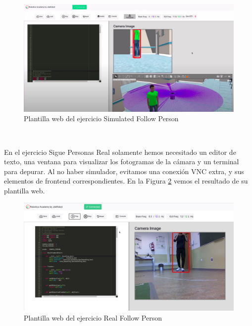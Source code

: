\begin{figure} [H]
  \begin{center}
    \includegraphics[width=15cm]{imagenes/cap5/plantilla-web-simulated-follow-person.png}
  \end{center}
  \caption[Plantilla web del ejercicio Simulated Follow Person]{Plantilla web del ejercicio Simulated Follow Person}
  \label{fig:plantilla_web_simulated_follow_person}
\end{figure}\

En el ejercicio Sigue Personas Real solamente hemos necesitado un editor de texto, una ventana para visualizar los fotogramas de la cámara y un terminal para depurar. Al no haber simulador, evitamos una conexión VNC extra, y sus elementos de frontend correspondientes. En la Figura \ref{fig:plantilla_web_real_follow_person} vemos el resultado de su plantilla web.\\

\begin{figure} [H]
  \begin{center}
    \includegraphics[width=15cm]{imagenes/cap5/plantilla-web-real-follow-person.png}
  \end{center}
  \caption[Plantilla web del ejercicio Real Follow Person]{Plantilla web del ejercicio Real Follow Person}
  \label{fig:plantilla_web_real_follow_person}
\end{figure}

